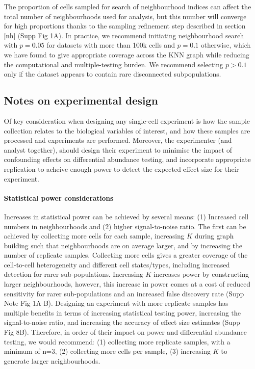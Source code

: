 \documentclass[
]{article}
\begin{document}
The proportion of cells sampled for search of neighbourhood indices can affect the total number of neighbourhoods used for analysis, but this number will converge for high proportions thanks to the sampling refinement step described in section \ref{nh} (Supp Fig 1A). In practice, we recommend initiating neighbourhood search with \(p=0.05\) for datasets with more than 100k cells and \(p=0.1\) otherwise, which we have found to give appropriate coverage across the KNN graph while reducing the computational and multiple-testing burden. We recommend selecting \(p > 0.1\) only if the dataset appears to contain rare disconnected subpopulations.

\hypertarget{notes-on-experimental-design}{%
\subsection{Notes on experimental design}\label{notes-on-experimental-design}}

Of key consideration when designing any single-cell experiment is how the sample collection relates to the biological variables of interest, and how these samples
are processed and experiments are performed. Moreover, the experimenter (and analyst together), should design their experiment to minimise the impact of confounding
effects on differential abundance testing, and incorporate appropriate replication to acheive enough power to detect the expected effect size for their
experiment.

\hypertarget{statistical-power-considerations}{%
\paragraph*{Statistical power considerations}\label{statistical-power-considerations}}

Increases in statistical power can be achieved by several means: (1) Increased cell numbers in neighbourhoods and (2) higher signal-to-noise ratio. The first can
be achieved by collecting more cells for each sample, increasing \(K\) during graph building such that neighbourhoods are on average larger, and by increasing the
number of replicate samples. Collecting more cells gives a greater coverage of the cell-to-cell heterogeneity and different cell states/types, including increased
detection for rarer sub-populations. Increasing \(K\) increases power by constructing larger neighbourhoods, however, this increase in power comes at a cost of
reduced sensitivity for rarer sub-populations and an increased false discovery rate (Supp Note Fig 1A-B). Designing an experiment with more replicate samples has
multiple benefits in terms of increasing statistical testing power, increasing the signal-to-noise ratio, and increasing the accuracy of effect size estimates
(Supp Fig 8B). Therefore, in order of their impact on power and differential abundance testing, we would recommend: (1) collecting more replicate samples, with
a minimum of n=3, (2) collecting more cells per sample, (3) increasing \(K\) to generate larger neighbourhoods.
\end{document}
